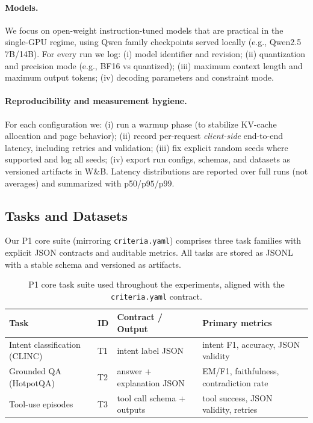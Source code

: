 \documentclass[11pt]{article}
\newcommand{\pninetyfive}{\ensuremath{\mathrm{p95}}}
\newcommand{\pninetynine}{\ensuremath{\mathrm{p99}}}
\begin{document}
\paragraph{Models.}
We focus on open-weight instruction-tuned models that are practical in the single-GPU regime, using Qwen family checkpoints served locally (e.g., Qwen2.5 7B/14B).
For every run we log:
(i) model identifier and revision;
(ii) quantization and precision mode (e.g., BF16 vs quantized);
(iii) maximum context length and maximum output tokens;
(iv) decoding parameters and constraint mode.

\paragraph{Reproducibility and measurement hygiene.}
For each configuration we:
(i) run a warmup phase (to stabilize KV-cache allocation and page behavior);
(ii) record per-request \emph{client-side} end-to-end latency, including retries and validation;
(iii) fix explicit random seeds where supported and log all seeds;
(iv) export run configs, schemas, and datasets as versioned artifacts in W\&B.
Latency distributions are reported over full runs (not averages) and summarized with p50/\pninetyfive/\pninetynine.

\subsection{Tasks and Datasets}
\label{sec:tasks}

Our P1 core suite (mirroring \texttt{criteria.yaml}) comprises three task families with explicit JSON contracts and auditable metrics.
All tasks are stored as JSONL with a stable schema and versioned as artifacts.

\begin{table}[t]
\centering
\small
\begin{tabular}{@{}llll@{}}
\toprule
\textbf{Task} & \textbf{ID} & \textbf{Contract / Output} & \textbf{Primary metrics} \\
\midrule
Intent classification (CLINC) & T1 & intent label JSON & intent F1, accuracy, JSON validity \\
Grounded QA (HotpotQA) & T2 & answer + explanation JSON & EM/F1, faithfulness, contradiction rate \\
Tool-use episodes & T3 & tool call schema + outputs & tool success, JSON validity, retries \\
\bottomrule
\end{tabular}
\caption{P1 core task suite used throughout the experiments, aligned with the \texttt{criteria.yaml} contract.}
\label{tab:task-suite}
\end{table}
\end{document}
